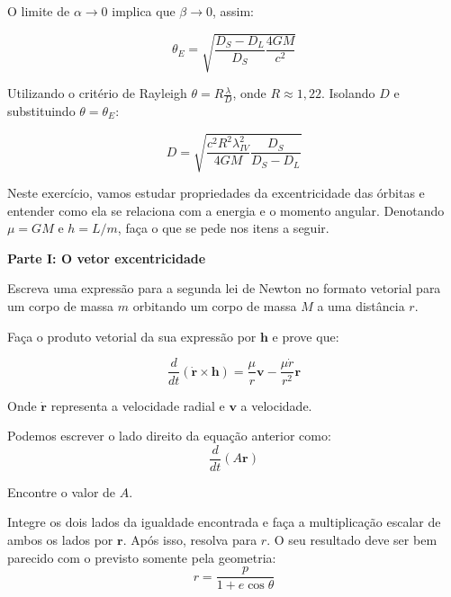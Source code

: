 \documentclass[11pt]{article}
\begin{document}
\begin{pproblem}
\begin{pssolution*}{}{}
\begin{alternativas}
            O limite de \(\alpha\rightarrow 0\) implica que \(\beta\rightarrow 0\), assim:

            \[\boxed{\theta_E=\sqrt{\frac{D_S-D_L}{D_S}\frac{4GM}{c^2}}}\]

            \item Utilizando o critério de Rayleigh \(\theta = R\frac{\lambda}{D}\), onde \(R\approx 1,22\). Isolando \(D\) e substituindo \(\theta = \theta_E\):
            
            \[\boxed{D =\sqrt{\frac{c^2R^2\lambda_{IV}^2}{4GM}\frac{D_S}{D_S-D_L}}}\]
        \end{alternativas}
    \end{pssolution*}
\end{pproblem}

\begin{pproblem}
    Neste exercício, vamos estudar propriedades da excentricidade das órbitas e entender como ela se relaciona com a energia e o momento angular. Denotando \(\mu = GM\) e \(h=L/m\), faça o que se pede nos itens a seguir.
    \begin{center}
        \textbf{Parte I: O vetor excentricidade}
    \end{center}
    \begin{alternativas}
        \item Escreva uma expressão para a segunda lei de Newton no formato vetorial para um corpo de massa \(m\) orbitando um corpo de massa \(M\) a uma distância \(r\).
        
        \item Faça o produto vetorial da sua expressão por \(\mathbf{h}\) e prove que:
        
        \[\frac{d}{dt}(\dot{\mathbf{r}}\times \mathbf{h}) = \frac{\mu}{r}\mathbf{v} - \frac{\mu \dot{r}}{r^2}\mathbf{r}\]

        Onde \(\dot{\mathbf{r}}\) representa a velocidade radial e \(\mathbf{v}\) a velocidade.

        \item Podemos escrever o lado direito da equação anterior como:
        \[\frac{d}{dt}\left(A\mathbf{r}\right)\]

        Encontre o valor de \(A\).

        \item Integre os dois lados da igualdade encontrada e faça a multiplicação escalar de ambos os lados por \(\mathbf{r}\). Após isso, resolva para \(r\). O seu resultado deve ser bem parecido com o previsto somente pela geometria:
        \[r = \frac{p}{1+e\cos\theta}\]


\end{alternativas}
\end{pproblem}
\end{document}
